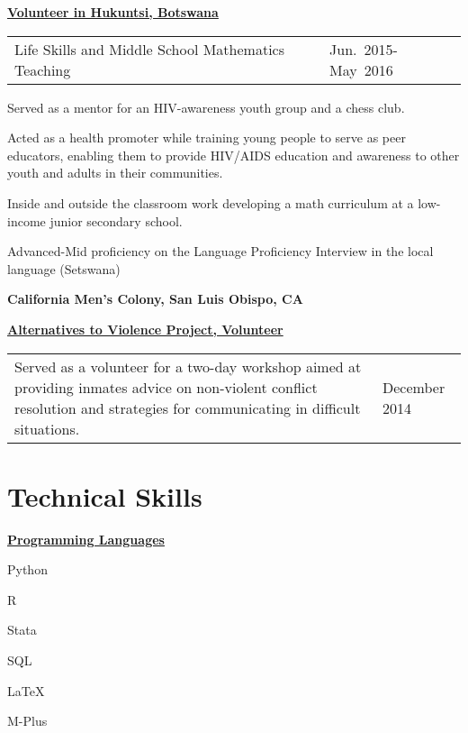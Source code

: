 \documentclass[margin,line]{res}
\newenvironment{list1}{
  \begin{list}{\ding{113}}{%
      \setlength{\itemsep}{0in}
      \setlength{\parsep}{0in} \setlength{\parskip}{0in}
      \setlength{\topsep}{0in} \setlength{\partopsep}{0in}
      \setlength{\leftmargin}{0.17in}}}{\end{list}}
\newenvironment{list3}{
        \begin{list}{\ding{113}}{%
            \setlength{\itemsep}{0in}
            \setlength{\parsep}{0in} \setlength{\parskip}{0in}
            \setlength{\topsep}{0in} \setlength{\partopsep}{0in}
            \setlength{\leftmargin}{0in}
            \setlength{\rightmargin}{1.25in}}}{\end{list}}
\renewcommand{\subsection}[1]{%
      \par\vspace{3pt}%
      \underline{\normalsize\bfseries #1}%
      \par\vspace{3pt}%
    }
\begin{document}
\begin{resume}
  \subsection{\sc Volunteer in Hukuntsi, Botswana}
  \begin{tabular}{@{}p{4in}p{1.0in}}
    Life Skills and Middle School Mathematics Teaching & \multirow{2}{1in}{Jun.~2015-May~2016}
  \end{tabular}
  \begin{list3}
  \item Served as a mentor for an HIV-awareness youth group and a chess club.
  \item Acted as a health promoter while training young people to serve as peer educators, enabling them
  to provide HIV/AIDS education and awareness to other youth and adults in their communities.
  \item Inside and outside the classroom work developing a math curriculum at a low-income junior secondary school.
  \item Advanced-Mid proficiency on the Language Proficiency Interview in the local language (Setswana)
  
  \end{list3}

  {\bf California Men's Colony, San Luis Obispo, CA}
  \subsection{\sc Alternatives to Violence Project, Volunteer}
  \begin{tabular}{@{}p{4in}p{1.0in}}
    Served as a volunteer for a two-day workshop aimed at providing inmates advice on non-violent conflict resolution and strategies for communicating in difficult situations. & \multirow{1}{1in}{December 2014}\\
  \end{tabular}


  \section{\sc Technical Skills}

  \subsection{\sc Programming Languages}
  \begin{list1}
    \item Python
    \item R
    \item Stata
    \item SQL
    \item \LaTeX
    \item M-Plus
    \end{list1}
  

\end{resume}
\end{document}
